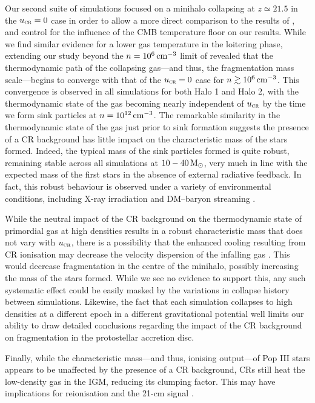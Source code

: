 \documentclass[../thesis.tex]{subfiles}
\begin{document}
Our second suite of simulations focused on a minihalo collapsing at $z\simeq21.5$ in the ${u}_{\textsc{cr}}=0$ case in order to allow a more direct comparison to the results of \citet{StacyBromm2007}, and control for the influence of the CMB temperature floor on our results.
While we find similar evidence for a lower gas temperature in the loitering phase, extending our study beyond the $n=10^6\,\mathrm{cm}^{-3}$ limit of \citet{StacyBromm2007} revealed that the thermodynamic path of the collapsing gas---and thus, the fragmentation mass scale---begins to converge with that of the ${u}_{\textsc{cr}}=0$ case for $n\gtrsim10^6\,\mathrm{cm}^{-3}$.  
This convergence is observed in all simulations for both Halo 1 and Halo 2, with the thermodynamic state of the gas becoming nearly independent of ${u}_{\textsc{cr}}$ by the time we form sink particles at $n=10^{12}\,\mathrm{cm}^{-3}$.
The remarkable similarity in the thermodynamic state of the gas just prior to sink formation suggests the presence of a CR background has little impact on the characteristic mass of the stars formed.  
Indeed, the typical mass of the sink particles formed is quite robust, remaining stable across all simulations at $10-40\,\mathrm{M}_{\odot}$, very much in line with the expected mass of the first stars in the absence of external radiative feedback. In fact, this robust behaviour is observed under a variety of environmental conditions, including X-ray irradiation \citep{Hummeletal2015} and DM--baryon streaming \citep{StacyBrommLoeb2011a,Greifetal2011b}.

While the neutral impact of the CR background on the thermodynamic state of primordial gas at high densities results in a robust characteristic mass that does not vary with ${u}_{\textsc{cr}}$, there is a possibility that the enhanced cooling resulting from CR ionisation may decrease the velocity dispersion of the infalling gas \citep{Clarketal2011a}.  
This would decrease fragmentation in the centre of the minihalo, possibly increasing the mass of the stars formed.
While we see no evidence to support this, any such systematic effect could be easily masked by the variations in collapse history between simulations.  
Likewise, the fact that each simulation collapses to high densities at a different epoch in a different gravitational potential well limits our ability to draw detailed conclusions regarding the impact of the CR background on fragmentation in the protostellar accretion disc.

Finally, while the characteristic mass---and thus, ionising output---of Pop III stars appears to be unaffected by the presence of a CR background, CRs still heat the low-density gas in the IGM, reducing its clumping factor. This may have implications for reionisation and the 21-cm signal \citep{FurlanettoPengBriggs2006, SazonovSunyaev2015}.
\end{document}
